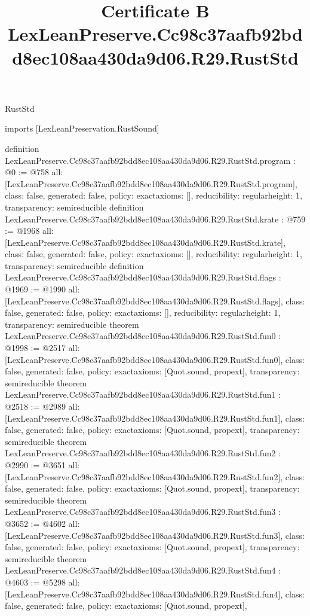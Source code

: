 \begin{lexlean}{RustStd}
\title{Certificate B LexLeanPreserve.Cc98c37aafb92bdd8ec108aa430da9d06.R29.RustStd}
\begin{coremodule}
imports [LexLeanPreservation.RustSound]

definition LexLeanPreserve.Cc98c37aafb92bdd8ec108aa430da9d06.R29.RustStd.program : @0 := @758 {
  all: [LexLeanPreserve.Cc98c37aafb92bdd8ec108aa430da9d06.R29.RustStd.program],
  class: false,
  generated: false,
  policy: exact{axioms: []},
  reducibility: regular{height: 1},
  transparency: semireducible
}
definition LexLeanPreserve.Cc98c37aafb92bdd8ec108aa430da9d06.R29.RustStd.krate : @759 := @1968 {
  all: [LexLeanPreserve.Cc98c37aafb92bdd8ec108aa430da9d06.R29.RustStd.krate],
  class: false,
  generated: false,
  policy: exact{axioms: []},
  reducibility: regular{height: 1},
  transparency: semireducible
}
definition LexLeanPreserve.Cc98c37aafb92bdd8ec108aa430da9d06.R29.RustStd.flags : @1969 := @1990 {
  all: [LexLeanPreserve.Cc98c37aafb92bdd8ec108aa430da9d06.R29.RustStd.flags],
  class: false,
  generated: false,
  policy: exact{axioms: []},
  reducibility: regular{height: 1},
  transparency: semireducible
}
theorem LexLeanPreserve.Cc98c37aafb92bdd8ec108aa430da9d06.R29.RustStd.fun0 : @1998 := @2517 {
  all: [LexLeanPreserve.Cc98c37aafb92bdd8ec108aa430da9d06.R29.RustStd.fun0],
  class: false,
  generated: false,
  policy: exact{axioms: [Quot.sound, propext]},
  transparency: semireducible
}
theorem LexLeanPreserve.Cc98c37aafb92bdd8ec108aa430da9d06.R29.RustStd.fun1 : @2518 := @2989 {
  all: [LexLeanPreserve.Cc98c37aafb92bdd8ec108aa430da9d06.R29.RustStd.fun1],
  class: false,
  generated: false,
  policy: exact{axioms: [Quot.sound, propext]},
  transparency: semireducible
}
theorem LexLeanPreserve.Cc98c37aafb92bdd8ec108aa430da9d06.R29.RustStd.fun2 : @2990 := @3651 {
  all: [LexLeanPreserve.Cc98c37aafb92bdd8ec108aa430da9d06.R29.RustStd.fun2],
  class: false,
  generated: false,
  policy: exact{axioms: [Quot.sound, propext]},
  transparency: semireducible
}
theorem LexLeanPreserve.Cc98c37aafb92bdd8ec108aa430da9d06.R29.RustStd.fun3 : @3652 := @4602 {
  all: [LexLeanPreserve.Cc98c37aafb92bdd8ec108aa430da9d06.R29.RustStd.fun3],
  class: false,
  generated: false,
  policy: exact{axioms: [Quot.sound, propext]},
  transparency: semireducible
}
theorem LexLeanPreserve.Cc98c37aafb92bdd8ec108aa430da9d06.R29.RustStd.fun4 : @4603 := @5298 {
  all: [LexLeanPreserve.Cc98c37aafb92bdd8ec108aa430da9d06.R29.RustStd.fun4],
  class: false,
  generated: false,
  policy: exact{axioms: [Quot.sound, propext]},
}
\end{coremodule}
\end{lexlean}
